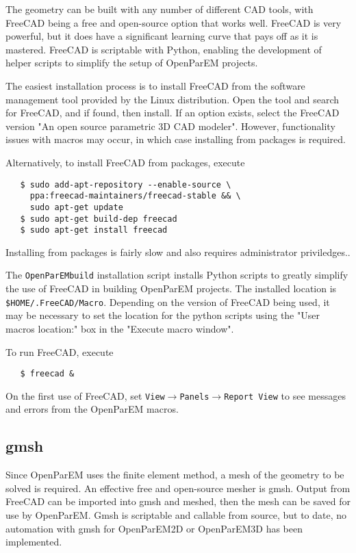 \documentclass[titlepage]{article}
\renewcommand\_{\textunderscore\linebreak[1]}
\begin{document}
The geometry can be built with any number of different CAD tools, with FreeCAD \cite{freecad} being a free and open-source option that works well.  FreeCAD is very powerful, but it does have a significant learning curve that pays off as it is mastered.  FreeCAD is scriptable with Python, enabling the development of helper scripts to simplify the setup of OpenParEM projects.

The easiest installation process is to install FreeCAD from the software management tool provided by the Linux distribution.  Open the tool and search for FreeCAD, and if found, then install.  If an option exists, select the FreeCAD version "An open source parametric 3D CAD modeler".  However, functionality issues with macros may occur, in which case installing from packages is required.

Alternatively, to install FreeCAD from packages, execute
\begin{verbatim}
   $ sudo add-apt-repository --enable-source \
     ppa:freecad-maintainers/freecad-stable && \
     sudo apt-get update
   $ sudo apt-get build-dep freecad
   $ sudo apt-get install freecad
\end{verbatim}
Installing from packages is fairly slow and also requires administrator priviledges..

The \texttt{OpenParEM\_build} installation script installs Python scripts to greatly simplify the use of FreeCAD in building OpenParEM projects.  The installed location is \texttt{\$HOME/.FreeCAD/Macro}.  Depending on the version of FreeCAD being used, it may be necessary to set the location for the python scripts using the "User macros location:" box in the "Execute macro window".

To run FreeCAD, execute
\begin{verbatim}
   $ freecad &
\end{verbatim}
On the first use of FreeCAD, set \texttt{View}$\rightarrow$\texttt{Panels}$\rightarrow$\texttt{Report View} to see messages and errors from the OpenParEM macros.

\subsection{gmsh}

Since OpenParEM uses the finite element method, a mesh of the geometry to be solved is required. An effective free and open-source mesher is gmsh. Output from FreeCAD can be imported into gmsh and meshed, then the mesh can be saved for use by OpenParEM.  Gmsh is scriptable and callable from source, but to date, no automation with gmsh for OpenParEM2D or OpenParEM3D has been implemented.
\end{document}
